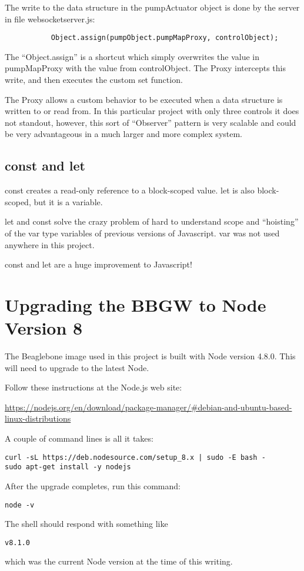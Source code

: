 The write to the data structure in the pumpActuator object is done by the 
server in file websocketserver.js:

\begin{verbatim}
           Object.assign(pumpObject.pumpMapProxy, controlObject);
\end{verbatim}

The ``Object.assign'' is a shortcut which simply overwrites the value in 
pumpMapProxy with the value from controlObject.  The Proxy intercepts this 
write, and then executes the custom set function.

The Proxy allows a custom behavior to be executed when a data structure is 
written to or read from.  In this particular project 
with only three controls it does not standout, however, this sort of 
``Observer'' pattern is very scalable and could be very advantageous in a much 
larger and more complex system.

\subsection{const and let}

const creates a read-only reference to a block-scoped value.
let is also block-scoped, but it is a variable.

let and const solve the crazy problem of hard to understand scope and 
``hoisting'' of the var type variables of previous versions of Javascript.
 var was not used anywhere in this project.
 
 const and let are a huge improvement to Javascript!
 
 \section{Upgrading the BBGW to Node Version 8}
 
 The Beaglebone image used in this project is built with Node version 4.8.0.  
 This will need to upgrade to the latest Node.
 
 Follow these instructions at the Node.js web site:
 
 \url{https://nodejs.org/en/download/package-manager/#debian-and-ubuntu-based-linux-distributions}

A couple of command lines is all it takes:

\begin{verbatim}
curl -sL https://deb.nodesource.com/setup_8.x | sudo -E bash -
sudo apt-get install -y nodejs
\end{verbatim}

After the upgrade completes, run this command:

\begin{verbatim}
node -v
\end{verbatim}

The shell should respond with something like

\begin{verbatim}
v8.1.0
\end{verbatim}

which was the current Node version at the time of this writing.

